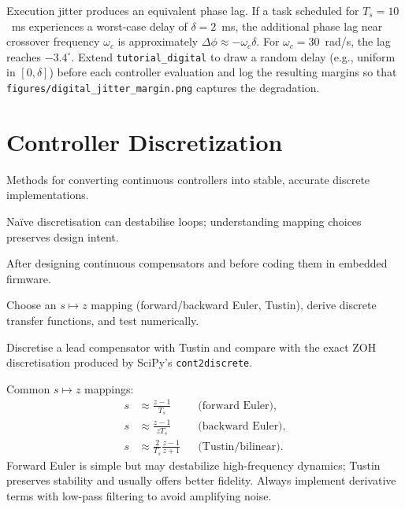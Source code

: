 Execution jitter produces an equivalent phase lag. If a task scheduled for $T_s = 10$~ms experiences a worst-case delay of $\delta = 2$~ms, the additional phase lag near crossover frequency $\omega_c$ is approximately $\Delta \phi \approx -\omega_c \delta$. For $\omega_c = 30$~rad/s, the lag reaches $-3.4^{\circ}$. Extend \texttt{tutorial\_digital} to draw a random delay (e.g., uniform in $[0, \delta]$) before each controller evaluation and log the resulting margins so that \texttt{figures/digital\_jitter\_margin.png} captures the degradation.

\section{Controller Discretization}
\begin{beginnerguide}
    \item[\textbf{What?}] Methods for converting continuous controllers into stable, accurate discrete implementations.
    \item[\textbf{Why?}] Naïve discretisation can destabilise loops; understanding mapping choices preserves design intent.
    \item[\textbf{When?}] After designing continuous compensators and before coding them in embedded firmware.
    \item[\textbf{How?}] Choose an $s\mapsto z$ mapping (forward/backward Euler, Tustin), derive discrete transfer functions, and test numerically.
    \item[\textbf{Example}] Discretise a lead compensator with Tustin and compare with the exact ZOH discretisation produced by SciPy’s \texttt{cont2discrete}.
\end{beginnerguide}
Common $s \mapsto z$ mappings:
\begin{align}
    s &\approx \frac{z - 1}{T_s} && \text{(forward Euler)},\\
    s &\approx \frac{z - 1}{z T_s} && \text{(backward Euler)},\\
    s &\approx \frac{2}{T_s} \frac{z - 1}{z + 1} && \text{(Tustin/bilinear)}.
\end{align}
Forward Euler is simple but may destabilize high-frequency dynamics; Tustin preserves stability and usually offers better fidelity. Always implement derivative terms with low-pass filtering to avoid amplifying noise.

